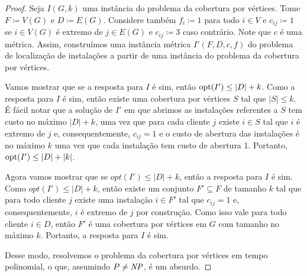 \begin{proof}

    Seja $I(G,k)$ uma instância do problema da cobertura por vértices. Tome $F \coloneqq V(G)$ e $D \coloneqq E(G)$. Considere também $f_i \coloneqq 1$ para todo $i \in V$ e $c_{ij} \coloneqq 1$ se $i \in V(G)$ é extremo de $j \in E(G)$ e $c_{ij} \coloneqq 3$ caso contrário. Note que $c$ é uma métrica. Assim, construímos uma instância métrica $I'(F,D,c,f)$ do problema de localização de instalações a partir de uma instância do problema da cobertura por vértices.


    Vamos mostrar que se a resposta para $I$ é sim, então $\mathrm{opt}(I') \leq |D| + k$. Como a resposta para $I$ é sim, então existe uma cobertura por vértices $S$ tal que $|S|\leq k$. É fácil notar que a solução de $I'$ em que abrimos as instalações referentes a $S$ tem custo no máximo $|D| + k$, uma vez que para cada cliente $j$ existe $i \in S$ tal que $i$ é extremo de $j$ e, consequentemente, $c_{ij} = 1$ e o custo de abertura das instalações é no máximo $k$ uma vez que cada instalação tem custo de abertura 1. Portanto, $\mathrm{opt}(I') \leq |D| + |k|$.

    Agora vamos mostrar que se $opt(I') \leq |D| + k$, então a resposta para $I$ é sim. Como $opt(I') \leq |D| + k$, então existe um conjunto $F' \subseteq F$ de tamanho $k$ tal que para todo cliente $j$ existe uma instalação $i \in F'$ tal que $c_{ij} = 1$ e, consequentemente, $i$ é extremo de $j$ por construção. Como isso vale para todo cliente $i \in D$, então $F'$ é uma cobertura por vértices em $G$ com tamanho no máximo $k$. Portanto, a resposta para $I$ é sim.

    Desse modo, resolvemos o problema da cobertura por vértices em tempo polinomial, o que, assumindo $P\neq\mathit{NP}$, é um absurdo.
\end{proof}
